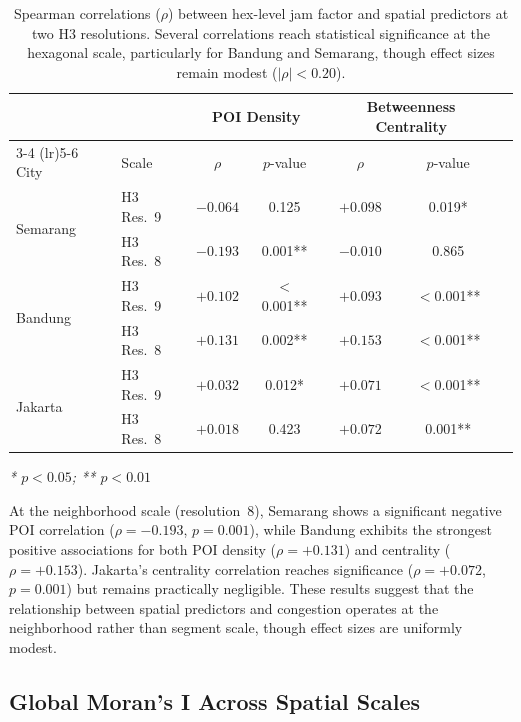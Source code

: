\documentclass[preprint,12pt]{elsarticle}
\begin{document}
\begin{table}[!htbp]
\centering
\caption{Spearman correlations ($\rho$) between hex-level jam factor and spatial predictors at two H3 resolutions. Several correlations reach statistical significance at the hexagonal scale, particularly for Bandung and Semarang, though effect sizes remain modest ($|\rho| < 0.20$).}
\label{tab:s5}
\begin{tabular}{llccccc}
\toprule
 & & \multicolumn{2}{c}{POI Density} & \multicolumn{2}{c}{Betweenness Centrality} \\
\cmidrule(lr){3-4} \cmidrule(lr){5-6}
City & Scale & $\rho$ & $p$-value & $\rho$ & $p$-value \\
\midrule
\multirow{2}{*}{Semarang}
 & H3 Res.\ 9 & $-0.064$ & 0.125 & $+0.098$ & 0.019* \\
 & H3 Res.\ 8 & $-0.193$ & 0.001** & $-0.010$ & 0.865 \\
\midrule
\multirow{2}{*}{Bandung}
 & H3 Res.\ 9 & $+0.102$ & $<$0.001** & $+0.093$ & $<$0.001** \\
 & H3 Res.\ 8 & $+0.131$ & 0.002** & $+0.153$ & $<$0.001** \\
\midrule
\multirow{2}{*}{Jakarta}
 & H3 Res.\ 9 & $+0.032$ & 0.012* & $+0.071$ & $<$0.001** \\
 & H3 Res.\ 8 & $+0.018$ & 0.423 & $+0.072$ & 0.001** \\
\bottomrule
\end{tabular}

\smallskip
\noindent\textit{* $p < 0.05$; ** $p < 0.01$}
\end{table}

At the neighborhood scale (resolution~8), Semarang shows a significant negative POI correlation ($\rho = -0.193$, $p = 0.001$), while Bandung exhibits the strongest positive associations for both POI density ($\rho = +0.131$) and centrality ($\rho = +0.153$). Jakarta's centrality correlation reaches significance ($\rho = +0.072$, $p = 0.001$) but remains practically negligible. These results suggest that the relationship between spatial predictors and congestion operates at the neighborhood rather than segment scale, though effect sizes are uniformly modest.

\subsection{Global Moran's I Across Spatial Scales}
\end{document}
